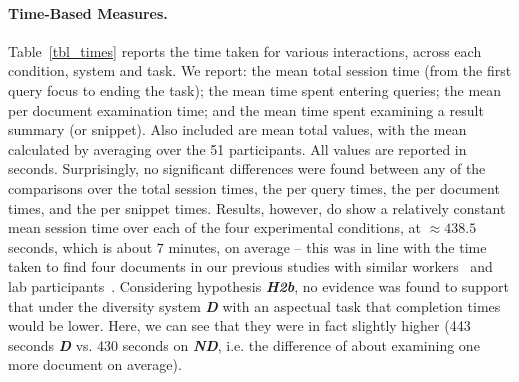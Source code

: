 \paragraph{Time-Based Measures.} Table~\ref{tbl_times} reports the time taken for various interactions, across each condition, system and task. We report: the mean total session time (from the first query focus to ending the task); the mean time spent entering queries; the mean per document examination time; and the mean time spent examining a result summary (or snippet). Also included are mean total values, with the mean calculated by averaging over the 51 participants. All values are reported in seconds. Surprisingly, no significant differences were found between any of the comparisons over the total session times, the per query times, the per document times, and the per snippet times. Results, however, do show a relatively constant mean session time over each of the four experimental conditions, at $\approx438.5$ seconds, which is about $7$ minutes, on average -- this was in line with the time taken to find four documents in our previous studies with similar workers~\cite{maxwell2017snippet_length} and lab participants~\cite{maxwell2016agents}.
Considering hypothesis \emph{\textbf{H2b}}, no evidence was found to support that under the diversity system \textbf{\emph{D}} with an aspectual task that completion times would be lower. Here, we can see that they were in fact slightly higher (443 seconds \textbf{\emph{D}} vs. 430 seconds on \textbf{\emph{ND}}, i.e. the difference of about examining one more document on average).

